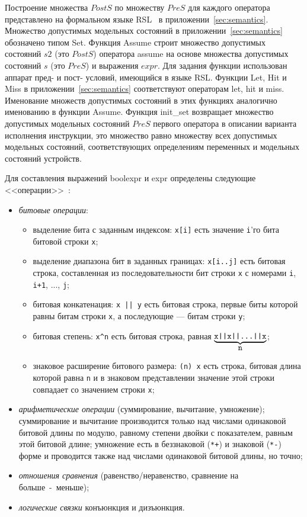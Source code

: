 Построение множества $PostS$ по множеству $PreS$ для каждого оператора представлено на формальном языке RSL~\cite{RSL} в приложении~\ref{sec:semantics}. Множество допустимых модельных состояний в приложении~\ref{sec:semantics} обозначено типом Set. Функция Assume строит множество допустимых состояний $s2$ (это $PostS$) оператора assume на основе множества допустимых состояний $s$ (это $PreS$) и выражения $expr$. Для задания функции использован аппарат пред- и пост- условий, имеющийся в языке RSL. Функции Let, Hit и Miss в приложении~\ref{sec:semantics} соответствуют операторам let, hit и miss. Именование множеств допустимых состояний в этих функциях аналогично именованию в функции Assume. Функция init\_set возвращает множество допустимых модельных состояний $PreS$ первого оператора в описании варианта исполнения инструкции, это множество равно множеству всех допустимых модельных состояний, соответствующих определениям переменных и модельных состояний устройств.

Для составления выражений boolexpr и expr определены следующие <<операции>>~\cite{my_syrcose_2008, my_isp_2008}:
\begin{itemize}
    \item \emph{битовые операции}:
        \begin{itemize}
            \item выделение бита с заданным индексом: \texttt{x[i]} есть значение \texttt{i}'го бита битовой строки \texttt{x};
            \item выделение диапазона бит в заданных границах: \texttt{x[i..j]} есть битовая строка, составленная из последовательности бит строки \texttt{x} с номерами \texttt{i}, \texttt{i+1}, ..., \texttt{j};
            \item битовая конкатенация: \texttt{x || y} есть битовая строка, первые биты которой равны битам строки \texttt{x}, а последующие --- битам строки \texttt{y};
            \item битовая степень: \texttt{x\^{ }n} есть битовая строка, равная $\underbrace{\mbox{\texttt{x||x||...||x}}}_{\mbox{\texttt{n}}}$;
            \item знаковое расширение битового размера: \texttt{(n) x} есть строка, битовая длина которой равна \texttt{n} и в знаковом представлении значение этой строки совпадает со значением строки \texttt{x};
        \end{itemize}
    \item \emph{арифметические операции} (суммирование, вычитание, умножение); суммирование и вычитание производится только над числами одинаковой битовой длины по модулю, равному степени двойки с показателем, равным этой битовой длине; умножение есть в беззнаковой  (\texttt{*+}) и знаковой (\texttt{*-}) форме и проводится также над числами одинаковой битовой длины, но точно;
    \item \emph{отношения сравнения} (равенство/неравенство, сравнение на\\больше~-~меньше);
    \item \emph{логические связки} конъюнкция и дизъюнкция.
\end{itemize}

